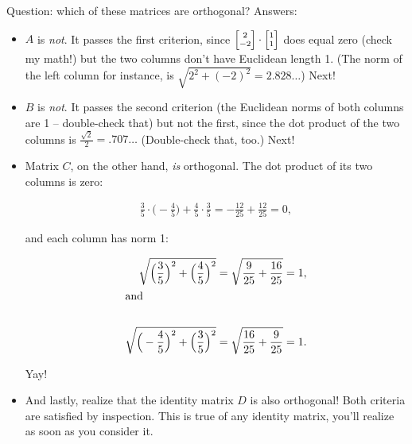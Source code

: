 \smallskip
Question: which of these matrices are orthogonal? Answers:

\vspace{-.1in}
\begin{itemize}
\itemsep.9em

\item $A$ is \textit{not}. It passes the first criterion, since
${\scriptsize \begin{bmatrix} 2 \\ -2 \end{bmatrix}} \cdot
{\scriptsize \begin{bmatrix} 1 \\ 1 \end{bmatrix}}$ does equal zero (check my
math!) but the two columns don't have Euclidean length 1. (The norm of the
left column for instance, is $\sqrt{2^2 + (-2)^2} = 2.828\dots$) Next!

\item $B$ is \textit{not}. It passes the second criterion (the Euclidean norms of both
columns are 1 -- double-check that) but not the first, since the dot product of
the two columns is $\frac{\sqrt{2}}{2} = .707\dots$ (Double-check that, too.)
Next!

\item Matrix $C$, on the other hand, \textit{is} orthogonal. The dot product of
its two columns is zero:

\vspace{-.15in}
\begin{align*}
\frac{3}{5} \cdot \Big(-\frac{4}{5}\Big) + 
\frac{4}{5} \cdot \frac{3}{5} = -\frac{12}{25} + \frac{12}{25} = 0,
\end{align*}
\vspace{-.15in}

and each column has norm 1:

\vspace{-.15in}
\begin{align*}
\sqrt{\Big(\frac{3}{5}\Big)^2 + \Big(\frac{4}{5}\Big)^2} = \sqrt{\frac{9}{25} + \frac{16}{25}} = 1, \\
\intertext{and} \\
\sqrt{\Big(-\frac{4}{5}\Big)^2 + \Big(\frac{3}{5}\Big)^2} = \sqrt{\frac{16}{25} + \frac{9}{25}} = 1.
\end{align*}
\vspace{-.15in}

Yay!

\item And lastly, realize that the identity matrix $D$ is also orthogonal! Both
criteria are satisfied by inspection. This is true of any identity matrix,
you'll realize as soon as you consider it.

\end{itemize}

